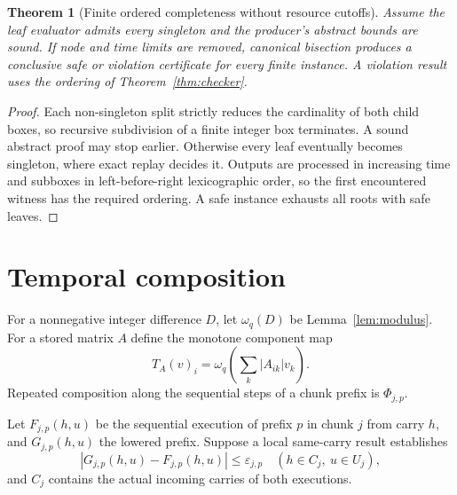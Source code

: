 \documentclass[11pt]{article}
\newtheorem{theorem}[definition]{Theorem}
\begin{document}
\begin{theorem}[Finite ordered completeness without resource cutoffs]\label{thm:complete}
Assume the leaf evaluator admits every singleton and the producer's abstract bounds are sound. If node and time limits are removed, canonical bisection produces a conclusive safe or violation certificate for every finite instance. A violation result uses the ordering of Theorem~\ref{thm:checker}.
\end{theorem}
\begin{proof}
Each non-singleton split strictly reduces the cardinality of both child boxes, so recursive subdivision of a finite integer box terminates. A sound abstract proof may stop earlier. Otherwise every leaf eventually becomes singleton, where exact replay decides it. Outputs are processed in increasing time and subboxes in left-before-right lexicographic order, so the first encountered witness has the required ordering. A safe instance exhausts all roots with safe leaves.
\end{proof}

\section{Temporal composition}
For a nonnegative integer difference $D$, let $\omega_q(D)$ be Lemma~\ref{lem:modulus}. For a stored matrix $A$ define the monotone component map
\[
  T_A(v)_i=\omega_q\!\left(\sum_k |A_{ik}|v_k\right).
\]
Repeated composition along the sequential steps of a chunk prefix is $\Phi_{j,p}$.

Let $F_{j,p}(h,u)$ be the sequential execution of prefix $p$ in chunk $j$ from carry $h$, and $G_{j,p}(h,u)$ the lowered prefix. Suppose a local same-carry result establishes
\[
 |G_{j,p}(h,u)-F_{j,p}(h,u)|\le\varepsilon_{j,p}
 \quad(h\in C_j,\ u\in U_j),
\]
and $C_j$ contains the actual incoming carries of both executions.
\end{document}
